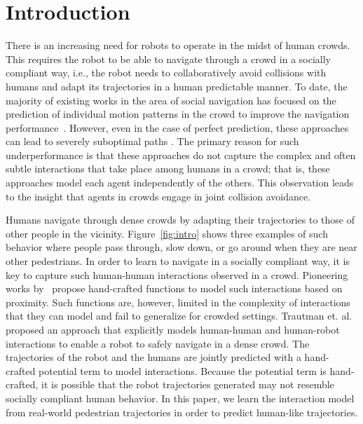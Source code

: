 \section{Introduction}
\label{sec:introduction}

There is an increasing need for robots to operate in the midst of
human crowds. This requires the robot to be able to navigate through a
crowd in a socially compliant way, i.e., the robot needs to
collaboratively avoid collisions with humans and adapt its
trajectories in a human predictable manner.
%
%
%
%
To date, the majority of existing works in the area of social
navigation has focused on the prediction of individual motion patterns
in the crowd to improve the navigation performance~\cite{thompson09,
  bennewitz05, large04}. However, even in the case of perfect
prediction, these approaches can lead to
%
severely suboptimal paths \cite{trautman10}.
%
The primary reason for such underperformance is that these approaches
do not capture the complex and often subtle interactions that take
place among humans in a crowd; that is, these approaches model each
agent independently of the others. This observation leads to the
insight that agents in crowds engage in joint collision avoidance.
%

%
%
%
%

Humans navigate through dense crowds by adapting their trajectories
%
to those of other people in the vicinity.
%
Figure~\ref{fig:intro} shows three examples of such behavior where
people pass through, slow down, or go around when they are near
other pedestrians.
%
In order to learn to navigate in a socially compliant way, it is key
to capture such human-human interactions observed in a crowd.
%
%
Pioneering works by~\cite{helbing95,hall63} propose hand-crafted
functions to model such interactions based on proximity. Such
functions are, however, limited in the complexity of interactions that
they can model and fail to generalize for crowded settings. Trautman
et. al. \cite{trautman10} proposed an approach that explicitly models
human-human and human-robot interactions to enable a robot to safely
navigate in a dense crowd. The trajectories of the robot and the
humans are jointly predicted with a hand-crafted potential term to
model interactions.
%
%
Because the potential term is hand-crafted, it is possible that the
robot trajectories generated may not resemble socially compliant human
behavior.  In this paper, we learn the interaction model from
real-world pedestrian trajectories in order to predict human-like
trajectories.

